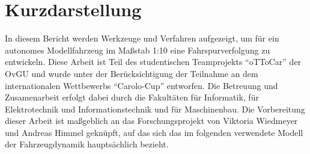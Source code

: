 \maketitle 
\setcounter{tocdepth}{2}

\section*{Kurzdarstellung}
In diesem Bericht werden Werkzeuge und Verfahren aufgezeigt, um für ein autonomes Modellfahrzeug im Maßstab 1:10 eine Fahrspurverfolgung zu entwickeln. Diese Arbeit ist Teil des studentischen Teamprojekts "`oTToCar"' der OvGU und wurde unter der Berücksichtigung der Teilnahme an dem internationalen Wettbewerbs "`Carolo-Cup"' \cite{RegelW} entworfen. Die Betreuung und Zusamenarbeit erfolgt dabei durch die Fakultäten für Informatik, für Elektrotechnik und Informationstechnik und für Maschinenbau. Die Vorbereitung dieser Arbeit ist maßgeblich an das Forschungsprojekt \cite{VikAnd} von Viktoria Wiedmeyer und Andreas Himmel geknüpft, auf das sich das im folgenden verwendete Modell der Fahrzeugdynamik hauptsächlich bezieht. 